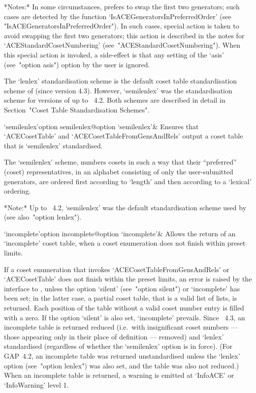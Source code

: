 *Notes:*
In  some  circumstances,  {\ACE}  prefers  to  swap  the   first   two
generators;   such   cases    are    detected    by    the    function
`IsACEGeneratorsInPreferredOrder'                                 (see
"IsACEGeneratorsInPreferredOrder"). In such cases, special  action  is
taken to avoid {\ACE} swapping the first two generators;  this  action
is   described   in   the   notes   for    `ACEStandardCosetNumbering'
(see~"ACEStandardCosetNumbering").  When  this   special   action   is
invoked, a side-effect is that any setting of the `asis'  (see~"option
asis") option by the user is ignored.

The  `lenlex'  standardisation  scheme  is  the  default  coset  table
standardisation  scheme  of  {\GAP}  (since  version  4.3).   However,
`semilenlex' was the standardisation scheme for versions of {\GAP}  up
to {\GAP}~4.2. Both schemes are described in detail in  Section~"Coset
Table Standardisation Schemes".

\>`semilenlex'{option semilenlex}@{option `semilenlex'}& 
Ensures that `ACECosetTable' and `ACECosetTableFromGensAndRels' output
a coset table that is `semilenlex' standardised.

The `semilenlex' scheme, numbers cosets  in  such  a  way  that  their
``preferred'' (coset) representatives, in an  alphabet  consisting  of
only the user-submitted generators, are  ordered  first  according  to
`length' and then according to a `lexical' ordering.

*Note:*
Up to {\GAP}~4.2, `semilenlex' was the default standardisation  scheme
used by {\GAP} (see also~"option lenlex").

\>`incomplete'{option incomplete}@{option `incomplete'}& 
Allows the return  of  an  `incomplete'  coset  table,  when  a  coset
enumeration does not finish within preset limits.

If a coset enumeration that invokes `ACECosetTableFromGensAndRels'  or
`ACECosetTable' does not finish within the preset limits, an error  is
raised  by  the  interface  to  {\GAP},  unless  the  option  `silent'
(see~"option silent") or `incomplete' has  been  set;  in  the  latter
case, a partial coset table, that is a valid {\GAP} list of lists,  is
returned. Each position of the table  without  a  valid  coset  number
entry is filled with a zero. If  the  option  `silent'  is  also  set,
`incomplete'  prevails.  Since  {\GAP}~4.3,  an  incomplete  table  is
returned reduced (i.e.~with  insignificant  coset  numbers  ---  those
appearing only in their place of definition --- removed) and  `lenlex'
standardised (regardless of whether  the  `semilenlex'  option  is  in
force). (For GAP~4.2, an incomplete table was returned  unstandardised
unless the `lenlex' option (see~"option lenlex") was also set, and the
table was also not reduced.) When an incomplete table is  returned,  a
warning is emitted at `InfoACE' or `InfoWarning' level 1.

